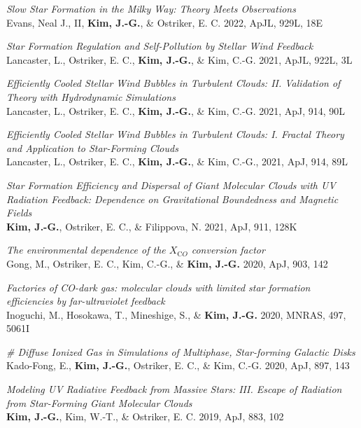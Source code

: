 \begin{benumerate}{16}
\item \textit{Slow Star Formation in the Milky Way: Theory Meets Observations}\\
  Evans, Neal J., II, \textbf{Kim, J.-G.}, \& Ostriker, E. C. 2022, ApJL, 929L,
  18E
\item \textit{Star Formation Regulation and Self-Pollution by Stellar Wind
    Feedback}\\
  Lancaster, L., Ostriker, E. C., \textbf{Kim, J.-G.}, \& Kim, C.-G. 2021, ApJL,
  922L, 3L
\item \textit{Efficiently Cooled Stellar Wind Bubbles in Turbulent Clouds:
    II. Validation of Theory with Hydrodynamic Simulations}\\
  Lancaster, L., Ostriker, E. C., \textbf{Kim, J.-G.}, \& Kim, C.-G. 2021, ApJ,
  914, 90L
\item \textit{Efficiently Cooled Stellar Wind Bubbles in Turbulent Clouds:
I. Fractal Theory and Application to Star-Forming Clouds}\\
  Lancaster, L., Ostriker, E. C., \textbf{Kim, J.-G.}, \& Kim, C.-G., 2021, ApJ,
914, 89L
\item \textit{Star Formation Efficiency and Dispersal of Giant Molecular
    Clouds with UV Radiation Feedback: Dependence on Gravitational Boundedness
    and Magnetic Fields} \\ \textbf{Kim, J.-G.}, Ostriker, E. C., \& Filippova,
  N. 2021, ApJ, 911, 128K
\item \textit{The environmental dependence of the $X_{\mathrm CO}$ conversion
    factor}\\ Gong, M., Ostriker, E. C., Kim, C.-G., \& \textbf{Kim,
    J.-G.} 2020, ApJ, 903, 142 
\item \textit{Factories of CO-dark gas: molecular clouds with limited star
formation efficiencies by far-ultraviolet feedback} \\
  Inoguchi, M., Hosokawa, T., Mineshige, S., \& \textbf{Kim, J.-G.} 2020, MNRAS,
  497, 5061I
\item \textit{\# Diffuse Ionized Gas in Simulations of Multiphase, Star-forming
    Galactic Disks}\\
  Kado-Fong, E., \textbf{Kim, J.-G.}, Ostriker, E. C., \& Kim, C.-G. 2020, ApJ,
  897, 143
\item \textit{Modeling UV Radiative Feedback from Massive Stars: III. Escape
    of Radiation from Star-Forming Giant Molecular Clouds} \\ \textbf{Kim,
    J.-G.}, Kim, W.-T., \& Ostriker, E. C. 2019, ApJ, 883, 102

\end{benumerate}
